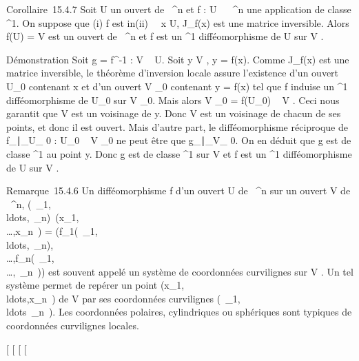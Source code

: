 \documentclass[]{article}
\begin{document}
Corollaire~15.4.7 Soit U un ouvert de ~^n et f : U \rightarrow~
~^n une application de classe ^1. On suppose que
(i) f est in\jmathective (ii) \forall~~x \in U,
J\_f(x) est une matrice inversible. Alors f(U) = V est un ouvert
de ~^n et f est un ^1 difféomorphisme de U sur V
.

Démonstration Soit g = f^-1 : V \rightarrow~ U. Soit y \in V , y = f(x).
Comme J\_f(x) est une matrice inversible, le théorème
d'inversion locale assure l'existence d'un ouvert U\_0 contenant
x et d'un ouvert V \_0 contenant y = f(x) tel que f induise un
^1 difféomorphisme de U\_0 sur V \_0. Mais
alors V \_0 = f(U\_0) \subset~ V . Ceci nous garantit que V est
un voisinage de y. Donc V est un voisinage de chacun de ses points, et
donc il est ouvert. Mais d'autre part, le difféomorphisme réciproque de
f\_∣\_U\_ 0 :
U\_0 \rightarrow~ V \_0 ne peut être que
g\_∣\_V\_ 0. On en
déduit que g est de classe ^1 au point y. Donc g est de
classe ^1 sur V et f est un ^1 difféomorphisme
de U sur V .

Remarque~15.4.6 Un difféomorphisme f d'un ouvert U de ~^n sur
un ouvert V de ~^n,
(\alpha~\_1,\\ldots,\alpha~\_n)\mapsto~(x\_1,\\\ldots,x\_n~)
=
(f\_1(\alpha~\_1,\\ldots,\alpha~\_n),\\\ldots,f\_n(\alpha~\_1,\\\ldots,\alpha~\_n~))
est souvent appelé un système de coordonnées curvilignes sur V . Un tel
système permet de repérer un point
(x\_1,\\ldots,x\_n~)
de V par ses coordonnées curvilignes
(\alpha~\_1,\\ldots\alpha~\_n~).
Les coordonnées polaires, cylindriques ou sphériques sont typiques de
coordonnées curvilignes locales.

{[}
{[}
{[}
{[}
\end{document}
